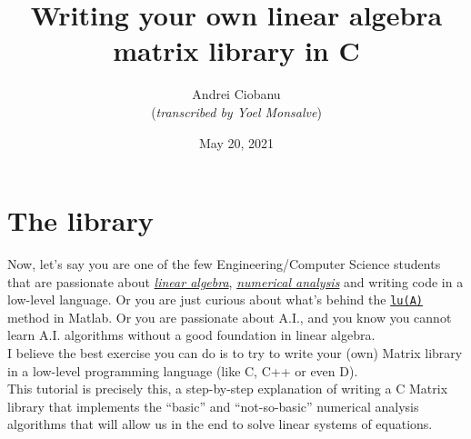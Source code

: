

\usepackage{titling}
\usepackage{alltt}
\usepackage{multirow}
\usepackage{graphicx}
\usepackage[table]{xcolor}

\def\pt{\textstyle{.}}
\def\ttindent{\ \ \ \ }

\setlength{\parindent}{0mm}

\title{Writing your own linear algebra matrix library in C}
\author{Andrei Ciobanu \\ (\textit{transcribed by Yoel Monsalve})}
\date{May 20, 2021}



\maketitle

\tableofcontents

\thispagestyle{empty} \pagestyle{myheadings}

\def\theequation{\arabic{section}.\arabic{equation}}    %

\section{The library}

Now, let’s say you are one of the few Engineering/Computer Science students that are passionate about \href{https://en.wikipedia.org/wiki/Linear_algebra}{\it linear algebra}, \href{https://en.wikipedia.org/wiki/Numerical_analysis}{\it numerical analysis} and writing code in a low-level language. Or you are just curious about what’s behind the \href{https://www.mathworks.com/help/matlab/ref/lu.html}{\tt lu(A)} method in Matlab. Or you are passionate about A.I., and you know you cannot learn A.I. algorithms without a good foundation in linear algebra.
\\

I believe the best exercise you can do is to try to write your (own) Matrix library in a low-level programming language (like C, C++ or even D).
\\

This tutorial is precisely this, a step-by-step explanation of writing a C Matrix library that implements the “basic” and “not-so-basic” numerical analysis algorithms that will allow us in the end to solve linear systems of equations.
\\

